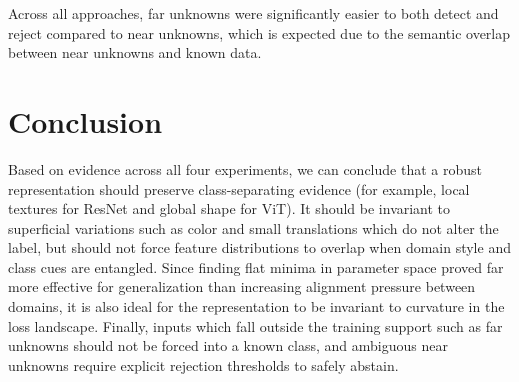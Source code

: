 \documentclass{article}
\begin{document}
Across all approaches, far unknowns were significantly easier to both detect and reject compared to near unknowns, which is expected due to the semantic overlap between near unknowns and known data.

\section{Conclusion}
\label{sec:conclusion}

Based on evidence across all four experiments, we can conclude that a robust representation should preserve class-separating evidence (for example, local textures for ResNet and global shape for ViT). It should be invariant to superficial variations such as color and small translations which do not alter the label, but should not force feature distributions to overlap when domain style and class cues are entangled. Since finding flat minima in parameter space proved far more effective for generalization than increasing alignment pressure between domains, it is also ideal for the representation to be invariant to curvature in the loss landscape. Finally, inputs which fall outside the training support such as far unknowns should not be forced into a known class, and ambiguous near unknowns require explicit rejection thresholds to safely abstain.
\end{document}

